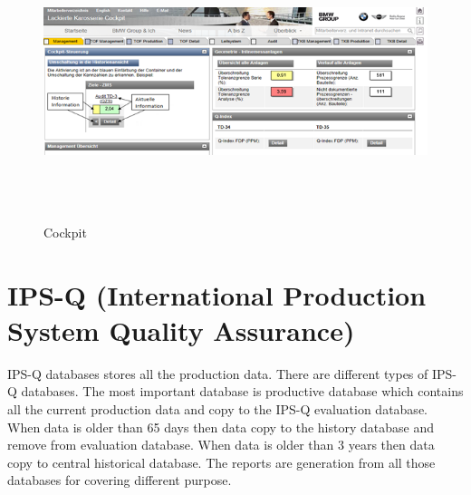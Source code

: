 \begin{figure}[!ht]
	\centering
		\includegraphics[width=598pt, height=229pt, width=1.0\textwidth]{images/cockpit.png}
	\caption[Cockpit]{Cockpit\footnotemark} 
	\label{fig:Cockpit}

\end{figure}

\newpage

\section{IPS-Q (International Production System Quality Assurance)}
IPS-Q databases stores all the production data. There are different types of IPS-Q databases. The most important database is productive database which contains all the current production data and copy to the IPS-Q evaluation database. When data is older than 65 days then data copy to the history database and remove from evaluation database. When data is older than 3 years then data copy to central historical database. The reports are generation from all those databases for covering different purpose. \\

